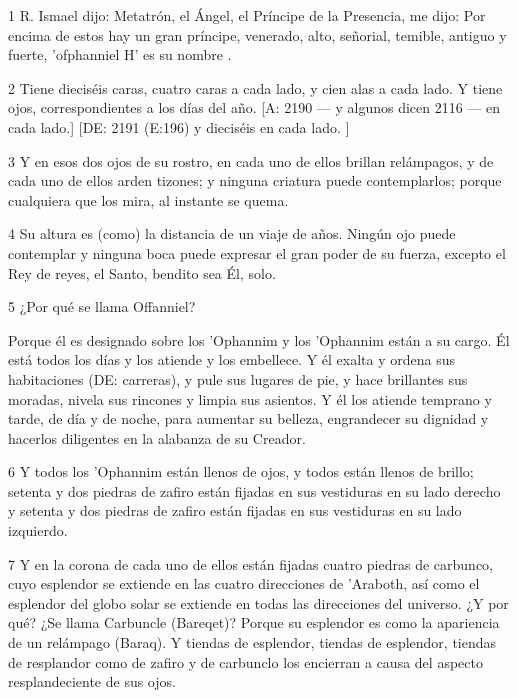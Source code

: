 \par 1 R. Ismael dijo: Metatrón, el Ángel, el Príncipe de la Presencia, me dijo: Por encima de estos hay un gran príncipe, venerado, alto, señorial, temible, antiguo y fuerte, 'ofphanniel H' es su nombre .

\par 2 Tiene dieciséis caras, cuatro caras a cada lado, y cien alas a cada lado. Y tiene ojos, correspondientes a los días del año. [A: 2190 — y algunos dicen 2116 — en cada lado.] [DE: 2191 (E:196) y dieciséis en cada lado. ]

\par 3 Y en esos dos ojos de su rostro, en cada uno de ellos brillan relámpagos, y de cada uno de ellos arden tizones; y ninguna criatura puede contemplarlos; porque cualquiera que los mira, al instante se quema.

\par 4 Su altura es (como) la distancia de un viaje de años. Ningún ojo puede contemplar y ninguna boca puede expresar el gran poder de su fuerza, excepto el Rey de reyes, el Santo, bendito sea Él, solo.

\par 5 ¿Por qué se llama Offanniel?

\par Porque él es designado sobre los 'Ophannim y los 'Ophannim están a su cargo. Él está todos los días y los atiende y los embellece. Y él exalta y ordena sus habitaciones (DE: carreras), y pule sus lugares de pie, y hace brillantes sus moradas, nivela sus rincones y limpia sus asientos. Y él los atiende temprano y tarde, de día y de noche, para aumentar su belleza, engrandecer su dignidad y hacerlos diligentes en la alabanza de su Creador.

\par 6 Y todos los 'Ophannim están llenos de ojos, y todos están llenos de brillo; setenta y dos piedras de zafiro están fijadas en sus vestiduras en su lado derecho y setenta y dos piedras de zafiro están fijadas en sus vestiduras en su lado izquierdo.

\par 7 Y en la corona de cada uno de ellos están fijadas cuatro piedras de carbunco, cuyo esplendor se extiende en las cuatro direcciones de 'Araboth, así como el esplendor del globo solar se extiende en todas las direcciones del universo. ¿Y por qué? ¿Se llama Carbuncle (Bareqet)? Porque su esplendor es como la apariencia de un relámpago (Baraq). Y tiendas de esplendor, tiendas de esplendor, tiendas de resplandor como de zafiro y de carbunclo los encierran a causa del aspecto resplandeciente de sus ojos.

